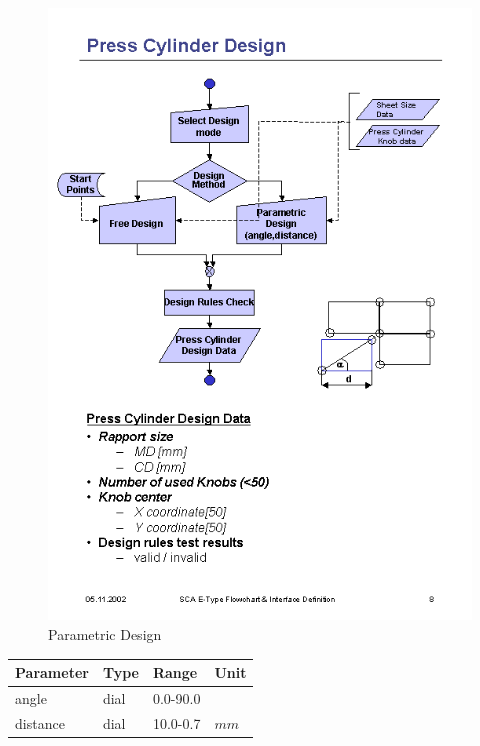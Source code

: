  
\begin{figure}[!Hhtp]
  \begin{center}
   \includegraphics[scale=0.7]{process/pdesign}
   \caption{Parametric Design}
  \end{center}
\end{figure}

\vspace{0.5cm}
\begin{tabular}{|l|l|l|l|} \hline
Parameter 		& Type 		& Range 	& Unit		\\ \hline
angle			& dial	& 0.0-90.0 		& \symbol{23}	\\ \hline
distance 		& dial	& 10.0-0.7 		& $mm$ 			\\ \hline
\end{tabular}
\vspace{0.5cm}

